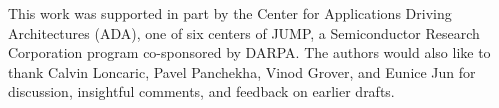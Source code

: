 \documentclass[sigplan,screen]{acmart}\settopmatter{}
\begin{document}







\begin{acks}
  This work was supported in part by the Center for Applications Driving Architectures (ADA),
  one of six centers of JUMP, a Semiconductor Research Corporation program co-sponsored by DARPA.
  The authors would also like to thank Calvin Loncaric, Pavel Panchekha, Vinod Grover, and
  Eunice Jun for discussion, insightful comments, and feedback on earlier drafts.
\end{acks}





\end{document}
